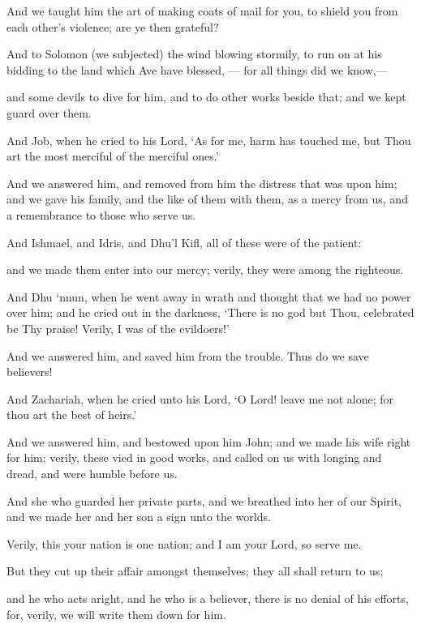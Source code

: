 \documentclass[fontsize=14pt, letterpaper, notitlepage, openany, DIV=12]{scrbook} %
\begin{document}
\noindent[21:80]
And we taught him the art of making coats of mail for you, to shield you from each
other's violence; are ye then grateful?

\noindent[21:81]
And to Solomon (we subjected) the wind blowing stormily, to run on at his bidding to the
land which Ave have blessed, --- for all things did we know,---

\noindent[21:82]
and some devils to dive for him, and to do other works beside that; and we kept guard
over them.

\noindent[21:83]
And Job, when he cried to his Lord, `As for me, harm has touched me, but Thou art the
most merciful of the merciful ones.'

\noindent[21:84]
And we answered him, and removed from him the distress that was upon him; and we
gave his family, and the like of them with them, as a mercy from us, and a remembrance to those
who serve us.

\noindent[21:85]
And Ishmael, and Idris, and Dhu'l Kifl, all of these were of the patient:

\noindent[21:86]
and we made them enter into our mercy; verily, they were among the righteous.

\noindent[21:87]
And Dhu `nnun, when he went away in wrath and thought that we had no power over
him; and he cried out in the darkness, `There is no god but Thou, celebrated be Thy praise!
Verily, I was of the evildoers!'

\noindent[21:88]
And we answered him, and saved him from the trouble. Thus do we save believers!

\noindent[21:89]
And Zachariah, when he cried unto his Lord, `O Lord! leave me not alone; for thou art
the best of heirs.'

\noindent[21:90]
And we answered him, and bestowed upon him John; and we made his wife right for
him; verily, these vied in good works, and called on us with longing and dread, and were humble
before us.

\noindent[21:91]
And she who guarded her private parts, and we breathed into her of our Spirit, and we
made her and her son a sign unto the worlds.

\noindent[21:92]
Verily, this your nation is one nation; and I am your Lord, so serve me.

\noindent[21:93]
But they cut up their affair amongst themselves; they all shall return to us;

\noindent[21:94]
and he who acts aright, and he who is a believer, there is no denial of his efforts, for,
verily, we will write them down for him.
\end{document}
